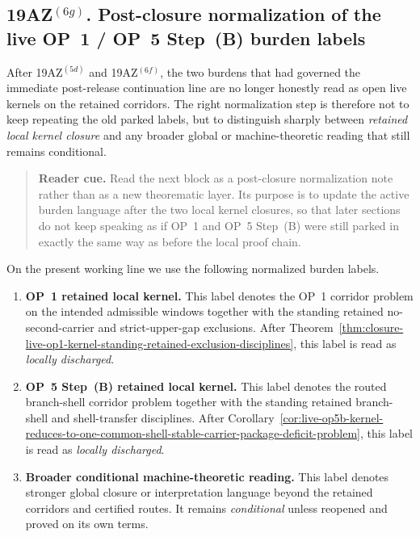 \subsection*{19AZ$^{(6g)}$. Post-closure normalization of the live OP~1 / OP~5 Step~(B) burden labels}
\label{sec:post-closure-normalization-op1-op5b-burden-labels}
After 19AZ$^{(5d)}$ and 19AZ$^{(6f)}$, the two burdens that had governed the immediate post-release continuation line are no longer honestly read as open live kernels on the retained corridors. The right normalization step is therefore not to keep repeating the old parked labels, but to distinguish sharply between \emph{retained local kernel closure} and any broader global or machine-theoretic reading that still remains conditional.

\begin{quote}\small
\noindent\textbf{Reader cue.} Read the next block as a post-closure normalization note rather than as a new theorematic layer. Its purpose is to update the active burden language after the two local kernel closures, so that later sections do not keep speaking as if OP~1 and OP~5 Step~(B) were still parked in exactly the same way as before the local proof chain.
\end{quote}

\begin{definition}
\label{def:post-closure-burden-labels-retained-op-kernels}
On the present working line we use the following normalized burden labels.
\begin{enumerate}[leftmargin=2em]
 \item \textbf{OP~1 retained local kernel.} This label denotes the OP~1 corridor problem on the intended admissible windows together with the standing retained no-second-carrier and strict-upper-gap exclusions. After Theorem~\ref{thm:closure-live-op1-kernel-standing-retained-exclusion-disciplines}, this label is read as \emph{locally discharged}.
 \item \textbf{OP~5 Step~(B) retained local kernel.} This label denotes the routed branch-shell corridor problem together with the standing retained branch-shell and shell-transfer disciplines. After Corollary~\ref{cor:live-op5b-kernel-reduces-to-one-common-shell-stable-carrier-package-deficit-problem}, this label is read as \emph{locally discharged}.
 \item \textbf{Broader conditional machine-theoretic reading.} This label denotes stronger global closure or interpretation language beyond the retained corridors and certified routes. It remains \emph{conditional} unless reopened and proved on its own terms.
\end{enumerate}
\end{definition}

